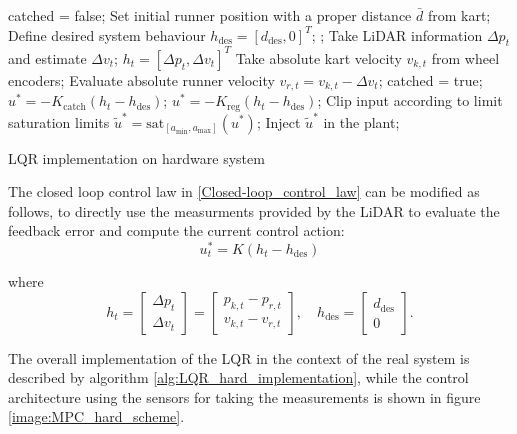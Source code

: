 \documentclass[a4paper,12pt,oneside]{book}
\begin{document}
\begin{algorithm}
\begin{algorithmic}[1]
	\State catched = false;
	\State Set initial runner position with a proper distance $\bar{d}$ from kart;
	\State Define desired system behaviour  $h_{\text{des}} = [d_{\text{des}}, 0]^T$;
	;
		\State Take LiDAR information $\Delta p_t$ and estimate $\Delta v_t$;
		\State $h_t = [\Delta p_t, \Delta v_t]^T$
		\State Take absolute kart velocity $v_{k,t}$ from wheel encoders;
		\State Evaluate absolute runner velocity $v_{r,t} = v_{k,t} - \Delta v_t $;
			\State catched = true;
		\EndIf
			\State $u^* = - K_{\text{catch}} (h_t - h_{\text{des}}) $;
		\Else 
			\State $u^* = - K_{\text{reg}} (h_t - h_{\text{des}}) $;
		\EndIf
		\State Clip input according to limit saturation limits $\tilde{u}^* = \text{sat}_{[a_{\min}, a_{\max}]} (u^*)$;
		\State Inject $\tilde{u}^*$ in the plant;
	\EndFor
\caption{LQR implementation on hardware system}
\label{alg:LQR_hard_implementation}
\end{algorithmic}
\end{algorithm}

\bigskip
The closed loop control law in \eqref{Closed-loop_control_law} can be modified as follows, to directly use the measurments provided by the LiDAR to evaluate the feedback error and compute the current control action:
\begin{equation}
    u_t^* = K (h_t - h_{\text{des}})
\label{Closed-loop_control_law_sensors}
\end{equation}

where 
\begin{equation}
    h_t =
    \begin{bmatrix}
        \Delta p_t  \\
        \Delta v_t
    \end{bmatrix}
	=
    \begin{bmatrix}
        p_{k,t} - p_{r,t} \\
        v_{k,t} - v_{r,t}
    \end{bmatrix},
    \quad
    h_{\text{des}} =
    \begin{bmatrix}
        d_{\text{des}} \\
        0
    \end{bmatrix}.
\end{equation}

The overall implementation of the LQR in the context of the real system is described by algorithm \ref{alg:LQR_hard_implementation}, while the control architecture using the sensors for taking the measurements is shown in figure \ref{image:MPC_hard_scheme}.
\end{document}
